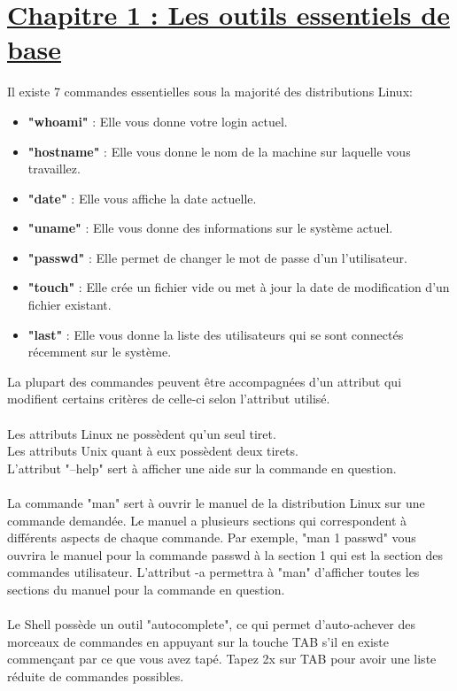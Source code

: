 \documentclass[12pt, a4paper]{article}
\begin{document}
\section*{\underline{Chapitre 1 : Les outils essentiels de base}}
Il existe 7 commandes essentielles sous la majorité des distributions Linux:
\begin{itemize}
  \setlength\itemsep{-0.4em}
\item \textbf{"whoami"} : Elle vous donne votre login actuel.
\item \textbf{"hostname"} : Elle vous donne le nom de la machine sur laquelle vous travaillez.
\item \textbf{"date"} : Elle vous affiche la date actuelle.
\item \textbf{"uname"} : Elle vous donne des informations sur le système actuel.
\item \textbf{"passwd"} : Elle permet de changer le mot de passe d'un l'utilisateur.
\item \textbf{"touch"} : Elle crée un fichier vide ou met à jour la date de modification d'un fichier existant.
\item \textbf{"last"} : Elle vous donne la liste des utilisateurs qui se sont connectés récemment sur le système.
\end{itemize}
La plupart des commandes peuvent être accompagnées d'un attribut qui modifient certains critères de celle-ci selon l'attribut utilisé.\\
\\
Les attributs Linux ne possèdent qu'un seul tiret.\\
Les attributs Unix quant à eux possèdent deux tirets.\\
L'attribut "--help" sert à afficher une aide sur la commande en question.\\
\\
La commande "man" sert à ouvrir le manuel de la distribution Linux sur une commande demandée. Le manuel a plusieurs sections qui correspondent à différents aspects de chaque commande. Par exemple, "man 1 passwd" vous ouvrira le manuel pour la commande passwd à la section 1 qui est la section des commandes utilisateur. L'attribut -a permettra à "man" d'afficher toutes les sections du manuel pour la commande en question.\\
\\
Le Shell possède un outil "autocomplete", ce qui permet d'auto-achever des morceaux de commandes en appuyant sur la touche TAB s'il en existe commençant par ce que vous avez tapé. Tapez 2x sur TAB pour avoir une liste réduite de commandes possibles.\\
\end{document}
